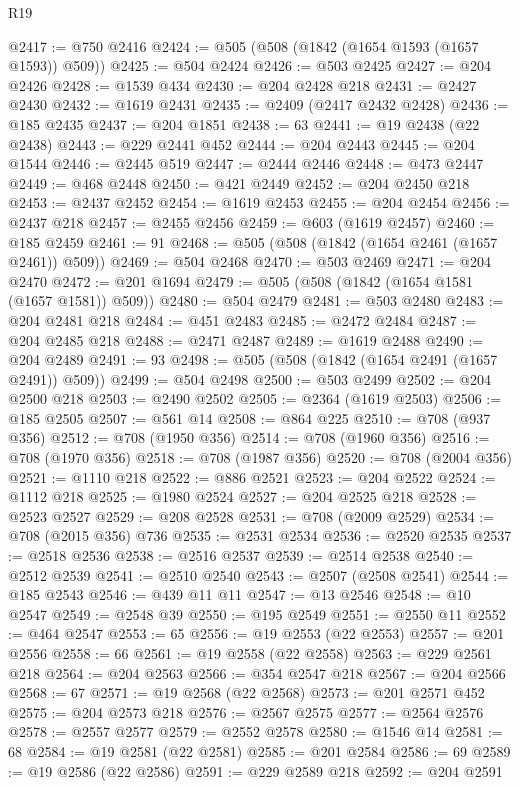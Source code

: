 \begin{lexlean}{R19}
\begin{coremodule}
{{{{{@2417 := @750 @2416
@2424 := @505 (@508 (@1842 (@1654 @1593 (@1657 @1593)) @509))
@2425 := @504 @2424
@2426 := @503 @2425
@2427 := @204 @2426
@2428 := @1539 @434
@2430 := @204 @2428 @218
@2431 := @2427 @2430
@2432 := @1619 @2431
@2435 := @2409 (@2417 @2432 @2428)
@2436 := @185 @2435
@2437 := @204 @1851
@2438 := 63
@2441 := @19 @2438 (@22 @2438)
@2443 := @229 @2441 @452
@2444 := @204 @2443
@2445 := @204 @1544
@2446 := @2445 @519
@2447 := @2444 @2446
@2448 := @473 @2447
@2449 := @468 @2448
@2450 := @421 @2449
@2452 := @204 @2450 @218
@2453 := @2437 @2452
@2454 := @1619 @2453
@2455 := @204 @2454
@2456 := @2437 @218
@2457 := @2455 @2456
@2459 := @603 (@1619 @2457)
@2460 := @185 @2459
@2461 := 91
@2468 := @505 (@508 (@1842 (@1654 @2461 (@1657 @2461)) @509))
@2469 := @504 @2468
@2470 := @503 @2469
@2471 := @204 @2470
@2472 := @201 @1694
@2479 := @505 (@508 (@1842 (@1654 @1581 (@1657 @1581)) @509))
@2480 := @504 @2479
@2481 := @503 @2480
@2483 := @204 @2481 @218
@2484 := @451 @2483
@2485 := @2472 @2484
@2487 := @204 @2485 @218
@2488 := @2471 @2487
@2489 := @1619 @2488
@2490 := @204 @2489
@2491 := 93
@2498 := @505 (@508 (@1842 (@1654 @2491 (@1657 @2491)) @509))
@2499 := @504 @2498
@2500 := @503 @2499
@2502 := @204 @2500 @218
@2503 := @2490 @2502
@2505 := @2364 (@1619 @2503)
@2506 := @185 @2505
@2507 := @561 @14
@2508 := @864 @225
@2510 := @708 (@937 @356)
@2512 := @708 (@1950 @356)
@2514 := @708 (@1960 @356)
@2516 := @708 (@1970 @356)
@2518 := @708 (@1987 @356)
@2520 := @708 (@2004 @356)
@2521 := @1110 @218
@2522 := @886 @2521
@2523 := @204 @2522
@2524 := @1112 @218
@2525 := @1980 @2524
@2527 := @204 @2525 @218
@2528 := @2523 @2527
@2529 := @208 @2528
@2531 := @708 (@2009 @2529)
@2534 := @708 (@2015 @356) @736
@2535 := @2531 @2534
@2536 := @2520 @2535
@2537 := @2518 @2536
@2538 := @2516 @2537
@2539 := @2514 @2538
@2540 := @2512 @2539
@2541 := @2510 @2540
@2543 := @2507 (@2508 @2541)
@2544 := @185 @2543
@2546 := @439 @11 @11
@2547 := @13 @2546
@2548 := @10 @2547
@2549 := @2548 @39
@2550 := @195 @2549
@2551 := @2550 @11
@2552 := @464 @2547
@2553 := 65
@2556 := @19 @2553 (@22 @2553)
@2557 := @201 @2556
@2558 := 66
@2561 := @19 @2558 (@22 @2558)
@2563 := @229 @2561 @218
@2564 := @204 @2563
@2566 := @354 @2547 @218
@2567 := @204 @2566
@2568 := 67
@2571 := @19 @2568 (@22 @2568)
@2573 := @201 @2571 @452
@2575 := @204 @2573 @218
@2576 := @2567 @2575
@2577 := @2564 @2576
@2578 := @2557 @2577
@2579 := @2552 @2578
@2580 := @1546 @14
@2581 := 68
@2584 := @19 @2581 (@22 @2581)
@2585 := @201 @2584
@2586 := 69
@2589 := @19 @2586 (@22 @2586)
@2591 := @229 @2589 @218
@2592 := @204 @2591
}}}}}
\end{coremodule}
\end{lexlean}

